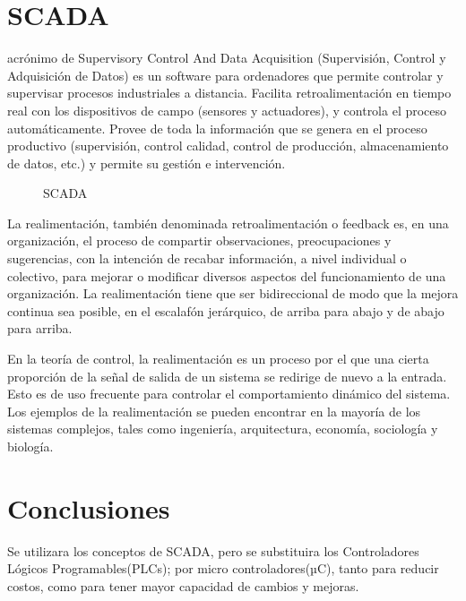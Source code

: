  \section{SCADA} acrónimo de Supervisory Control And Data Acquisition
 (Supervisión, Control y Adquisición de Datos) es un software para ordenadores
 que permite controlar y supervisar procesos industriales a distancia. Facilita
 retroalimentación en tiempo real con los dispositivos de campo (sensores y
 actuadores), y controla el proceso automáticamente. Provee de toda la
 información que se genera en el proceso productivo (supervisión, control
 calidad, control de producción, almacenamiento de datos, etc.) y permite su
 gestión e intervención.
 \begin{figure}[h]
   \centering
   
   \caption{SCADA}
   \label{fig:SCADA}
 \end{figure}
 La realimentación, también denominada retroalimentación o feedback es, en una
 organización, el proceso de compartir observaciones, preocupaciones y
 sugerencias, con la intención de recabar información, a nivel individual o
 colectivo, para mejorar o modificar diversos aspectos del funcionamiento de una
 organización. La realimentación tiene que ser bidireccional de modo que la
 mejora continua sea posible, en el escalafón jerárquico, de arriba para abajo y
 de abajo para arriba.

 En la teoría de control, la realimentación es un proceso por el que una cierta
 proporción de la señal de salida de un sistema se redirige de nuevo a la
 entrada. Esto es de uso frecuente para controlar el comportamiento dinámico del
 sistema. Los ejemplos de la realimentación se pueden encontrar en la mayoría de
 los sistemas complejos, tales como ingeniería, arquitectura, economía,
 sociología y biología.

\section{Conclusiones}

Se utilizara los conceptos de SCADA, pero se substituira los Controladores
Lógicos Programables(PLCs); por micro controladores(µC), tanto para reducir
costos, como para tener mayor capacidad de cambios y mejoras.
